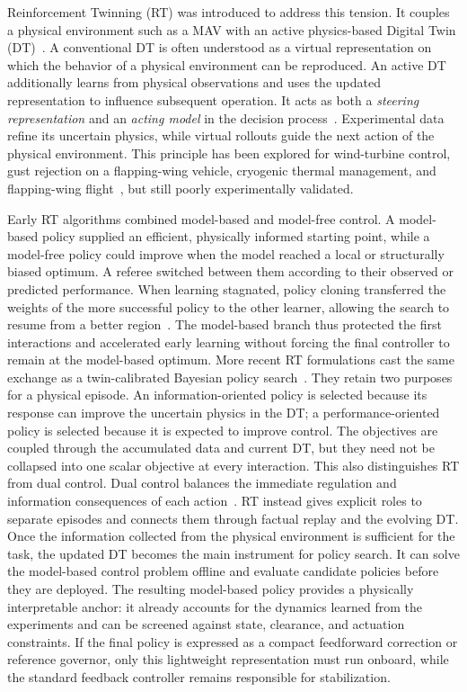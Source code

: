 \documentclass[journal]{IEEEtran}
\begin{document}
Reinforcement Twinning (RT) was introduced to address this tension. It couples a physical environment such as a MAV with an active physics-based Digital Twin (DT)~\cite{SchenaRT2023,Mendez2026,PolettiRT2025}. A conventional DT is often understood as a virtual representation on which the behavior of a physical environment can be reproduced. An active DT additionally learns from physical observations and uses the updated representation to influence subsequent operation. It acts as both a \emph{steering representation} and an \emph{acting model} in the decision process~\cite{Korenhof2021,Wagg2025}. Experimental data refine its uncertain physics, while virtual rollouts guide the next action of the physical environment. This principle has been explored for wind-turbine control, gust rejection on a flapping-wing vehicle, cryogenic thermal management, and flapping-wing flight~\cite{SchenaRT2023,PolettiRT2025}, but still poorly experimentally validated.

Early RT algorithms combined model-based and model-free control. A model-based policy supplied an efficient, physically informed starting point, while a model-free policy could improve when the model reached a local or structurally biased optimum. A referee switched between them according to their observed or predicted performance. When learning stagnated, policy cloning transferred the weights of the more successful policy to the other learner, allowing the search to resume from a better region~\cite{SchenaRT2023,PolettiRT2025}. The model-based branch thus protected the first interactions and accelerated early learning without forcing the final controller to remain at the model-based optimum.
More recent RT formulations cast the same exchange as a twin-calibrated Bayesian policy search~\cite{Mendez2026}. They retain two purposes for a physical episode. An information-oriented policy is selected because its response can improve the uncertain physics in the DT; a performance-oriented policy is selected because it is expected to improve control. The objectives are coupled through the accumulated data and current DT, but they need not be collapsed into one scalar objective at every interaction. This also distinguishes RT from dual control. Dual control balances the immediate regulation and information consequences of each action~\cite{Feldbaum1960,Filatov2000,Mesbah2018}. RT instead gives explicit roles to separate episodes and connects them through factual replay and the evolving DT. Once the information collected from the physical environment is sufficient for the task, the updated DT becomes the main instrument for policy search. It can solve the model-based control problem offline and evaluate candidate policies before they are deployed. The resulting model-based policy provides a physically interpretable anchor: it already accounts for the dynamics learned from the experiments and can be screened against state, clearance, and actuation constraints. If the final policy is expressed as a compact feedforward correction or reference governor, only this lightweight representation must run onboard, while the standard feedback controller remains responsible for stabilization.
\end{document}
